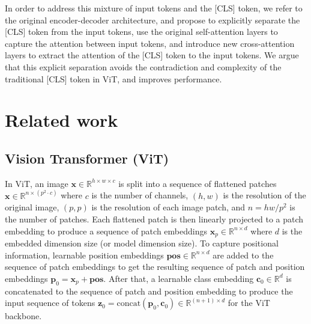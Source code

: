 \documentclass[anon,12pt]{colt2024} %
\begin{document}
In order to address this mixture of input tokens and the [CLS] token, we refer to the original encoder-decoder architecture, and propose to explicitly separate the [CLS] token from the input tokens, use the original self-attention layers to capture the attention between input tokens, and introduce new cross-attention layers to extract the attention of the [CLS] token to the input tokens.
We argue that this explicit separation avoids the contradiction and complexity of the traditional [CLS] token in ViT, and improves performance.

\section{Related work}

\subsection{Vision Transformer (ViT)}
In ViT, an image $\mathbf{x} \in \mathbb{R} ^ {h \times w \times c}$ is split into a sequence of flattened patches $\mathbf{x} \in \mathbb{R} ^ {n \times (p^2 \cdot c)}$ where $c$ is the number of channels, $(h,w)$ is the resolution of the original image, $(p,p)$ is the resolution of each image patch, and $n=hw/p^2$ is the number of patches.
Each flattened patch is then linearly projected to a patch embedding to produce a sequence of patch embeddings $\mathbf{x}_p \in \mathbb{R} ^ {n \times d}$ where $d$ is the embedded dimension size (or model dimension size).
To capture positional information, learnable position embeddings $\mathbf{pos} \in \mathbb{R} ^ {n \times d}$ are added to the sequence of patch embeddings to get the resulting sequence of patch and position embeddings $\mathbf{p}_0 = \mathbf{x}_p + \mathbf{pos}$.
After that, a learnable class embedding $\mathbf{c}_0 \in \mathbb{R}^d$ is concatenated to the sequence of patch and position embedding to produce the input sequence of tokens $\mathbf{z}_0 = \mathrm{concat}(\mathbf{p}_0,  \mathbf{c}_0) \in \mathbb{R} ^ {(n+1) \times d}$ for the ViT backbone.
\end{document}
